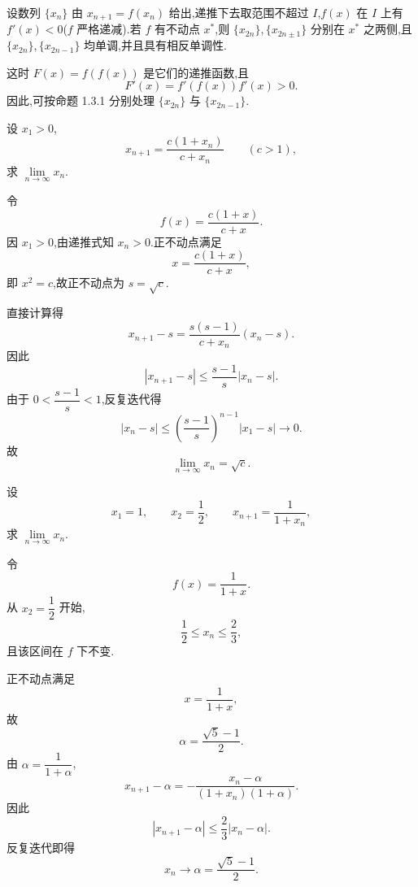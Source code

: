 \begin{proposition}[\markstar]
  设数列 $\{x_n\}$ 由 $x_{n+1}=f(x_n)$ 给出,递推下去取范围不超过 $I$,$f(x)$ 在 $I$ 上有 $f'(x)<0$($f$ 严格递减).若 $f$ 有不动点 $x^*$,则 $\{x_{2n}\},\{x_{2n\pm1}\}$ 分别在 $x^*$ 之两侧,且 $\{x_{2n}\},\{x_{2n-1}\}$ 均单调,并且具有相反单调性.
\end{proposition}

\begin{remark}
  这时 $F(x)=f(f(x))$ 是它们的递推函数,且
  \[
    F'(x)=f'(f(x))f'(x)>0.
  \]
  因此,可按命题 1.3.1 分别处理 $\{x_{2n}\}$ 与 $\{x_{2n-1}\}$.
\end{remark}

\begin{example}
  设 $x_1>0$,
  \[
    x_{n+1}=\dfrac{c(1+x_n)}{c+x_n}\qquad(c>1),
  \]
  求 $\displaystyle \lim\limits_{n\to\infty}x_n$.
\end{example}
\exampleblank

\begin{solution}

  令
  \[
    f(x)=\dfrac{c(1+x)}{c+x}.
  \]
  因 $x_1>0$,由递推式知 $x_n>0$.正不动点满足
  \[
    x=\dfrac{c(1+x)}{c+x},
  \]
  即 $x^2=c$,故正不动点为 $s=\sqrt c$.

  直接计算得
  \[
    x_{n+1}-s
    =\dfrac{s(s-1)}{c+x_n}(x_n-s).
  \]
  因此
  \[
    |x_{n+1}-s|
    \leq\dfrac{s-1}{s}|x_n-s|.
  \]
  由于 $0<\dfrac{s-1}{s}<1$,反复迭代得
  \[
    |x_n-s|
    \leq
    \left(\dfrac{s-1}{s}\right)^{n-1}|x_1-s|
    \longrightarrow0.
  \]
  故
  \[
    \displaystyle\lim\limits_{n\to\infty}x_n=\sqrt c.
  \]

\end{solution}

\begin{example}
  设
  \[
    x_1=1,
    \qquad
    x_2=\dfrac{1}{2},
    \qquad
    x_{n+1}=\dfrac{1}{1+x_n},
  \]
  求 $\displaystyle \lim\limits_{n\to\infty}x_n$.
\end{example}
\exampleblank

\begin{solution}

  令
  \[
    f(x)=\dfrac{1}{1+x}.
  \]
  从 $x_2=\dfrac{1}{2}$ 开始,
  \[
    \dfrac{1}{2}\leq x_n\leq\dfrac{2}{3},
  \]
  且该区间在 $f$ 下不变.

  正不动点满足
  \[
    x=\dfrac{1}{1+x},
  \]
  故
  \[
    \alpha=\dfrac{\sqrt5-1}{2}.
  \]
  由 $\alpha=\dfrac{1}{1+\alpha}$,
  \[
    x_{n+1}-\alpha
    =-\dfrac{x_n-\alpha}{(1+x_n)(1+\alpha)}.
  \]
  因此
  \[
    |x_{n+1}-\alpha|
    \leq\dfrac{2}{3}|x_n-\alpha|.
  \]
  反复迭代即得
  \[
    x_n\longrightarrow\alpha
    =\dfrac{\sqrt5-1}{2}.
  \]

\end{solution}

